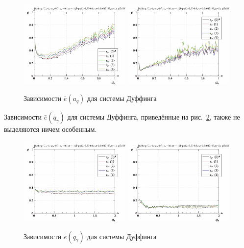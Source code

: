 \begin{figure}[ht!]
\begin{center}
  \includegraphics[width=0.49\textwidth]{p/cha/duff/duff_id-p_a_q_sign.png}
  \hfill
  \includegraphics[width=0.49\textwidth]{p/cha/duff/duff_id-p_a_q_sin.png}
\end{center}
  \caption{Зависимости $\bar{e}(a_q)$ для системы Дуффинга}
\label{atu:f:duff_e_a_q}
\end{figure}

Зависимости $\bar{e}(q_\gamma)$ для системы Дуффинга,
приведённые на рис.~\ref{atu:f:duff_e_q_gamma},
также не выделяются ничем особенным.

\begin{figure}[ht!]
\begin{center}
  \includegraphics[width=0.49\textwidth]{p/cha/duff/duff_id-p_q_gamma_sign.png}
  \hfill
  \includegraphics[width=0.49\textwidth]{p/cha/duff/duff_id-p_q_gamma_sin.png}
\end{center}
  \caption{Зависимости $\bar{e}(q_\gamma)$ для системы Дуффинга}
\label{atu:f:duff_e_q_gamma}
\end{figure}

